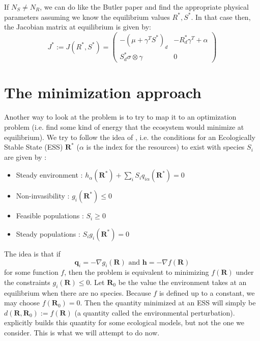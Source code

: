 \documentclass[12pt]{article}
\newcommand{\vect}[1]{\textbf{#1}}
\begin{document}
\begin{appendices}
		If $N_S \neq N_R$, we can do like the Butler paper and find the appropriate physical parameters assuming we know the equilibrium values $R^*, S^*$. In that case then, the Jacobian matrix at equilibrium is given by: 
		\begin{equation}
		 J^* := J(R^*, S^*) = \begin{pmatrix} -(\mu + \gamma^T S^*)_d & -R^*_d \gamma^T + \alpha \\ S^*_d \sigma \otimes \gamma & 0 \end{pmatrix} \label{eq : general jacobian positive equilibrium}
		 \end{equation}
		 		\clearpage
				\section{The minimization approach}
				Another way to look at the problem is to try to map it to an optimization problem (i.e. find some kind of energy that the ecosystem would minimize at equilibrium). We try to follow the idea of \cite{PankajNiche}, i.e. the conditions for an Ecologically Stable State (ESS) $\vect{R}^*$ ($\alpha$ is the index for the resources) to exist with species $S_i$ are given by :
				\begin{itemize}
					\item Steady environment : $h_\alpha(\vect{R}^*) + \sum_i S_i q_{i\alpha}(\vect{R}^*) = 0$
					\item Non-invasibility : $g_i(\vect{R}^*) \leq 0$
					\item Feasible populations : $S_i \geq 0$
					\item Steady populations : $S_i g_i(\vect{R}^*)=0$
				\end{itemize}
		The idea is that if 
		\begin{equation}
			\vect{q}_i = - \nabla g_i(\vect{R}) \text{ and } \vect{h} = - \nabla f(\vect{R})
		\end{equation}
		for some function $f$, then the problem is equivalent to minimizing $f(\vect{R})$ under the constraints $g_i(\vect{R}) \leq 0$. Let $\vect{R}_0$ be the value the environment takes at an equilibrium when there are no species. Because $f$ is defined up to a constant, we may choose $f(\vect{R}_0)  = 0 $. Then the quantity minimized at an ESS will simply be $d(\vect{R}, \vect{R}_0) := f(\vect{R})$ (a quantity called the environmental perturbation). \cite{PankajNiche} explicitly builds this quantity for some ecological models, but not the one we consider. This is what we will attempt to do now.

\end{appendices}
\end{document}
